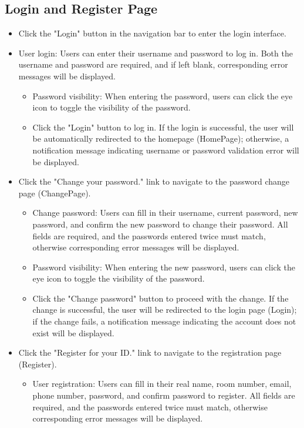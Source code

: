 \documentclass{article}
\begin{document}
\subsection{Login and Register Page}
\begin{itemize}
    \item Click the "Login" button in the navigation bar to enter the login interface.
    \item User login: Users can enter their username and password to log in. Both the username and password are required, and if left blank, corresponding error messages will be displayed.
    \begin{itemize}
        \item Password visibility: When entering the password, users can click the eye icon to toggle the visibility of the password.
        \item Click the "Login" button to log in. If the login is successful, the user will be automatically redirected to the homepage (HomePage); otherwise, a notification message indicating username or password validation error will be displayed.
    \end{itemize}
    \item Click the "Change your password." link to navigate to the password change page (ChangePage).
    \begin{itemize}
        \item Change password: Users can fill in their username, current password, new password, and confirm the new password to change their password. All fields are required, and the passwords entered twice must match, otherwise corresponding error messages will be displayed.
        \item Password visibility: When entering the new password, users can click the eye icon to toggle the visibility of the password.
        \item Click the "Change password" button to proceed with the change. If the change is successful, the user will be redirected to the login page (Login); if the change fails, a notification message indicating the account does not exist will be displayed.
    \end{itemize}
    \item Click the "Register for your ID." link to navigate to the registration page (Register).
    \begin{itemize}
        \item User registration: Users can fill in their real name, room number, email, phone number, password, and confirm password to register. All fields are required, and the passwords entered twice must match, otherwise corresponding error messages will be displayed.

\end{itemize}
\end{itemize}
\end{document}
